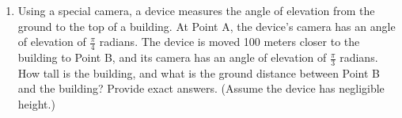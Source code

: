 \documentclass{article}
\begin{document}
\begin{enumerate}
\begin{solution}
A diagram of the situation is shown below (not to scale.)


We can first find the horizontal length in the bottom right triangle:

\begin{align*}
    \tan \ang{1.3} &= \frac{65\text{ ft}}{x} \\
    x &= \frac{65 \text{ ft}}{\tan \ang{1.3}}
\end{align*}


Then we can determine the missing vertical length:

\begin{align*}
    \tan \ang{27} &= \frac{y}{x} \\
    y &= x\tan \ang{27} \\
    &= \left(\frac{65 \text{ ft}}{\tan \ang{1.3}}\right) \tan \ang{27} \\
    & \approx 1459 \text{ ft}
\end{align*}
\end{solution}
    

\pspace{\newpage}

\item Using a special camera, a device measures the angle of elevation from the ground to the top of a building. At Point A, the device's camera has an angle of elevation of $\frac{\pi}{4}$ radians. The device is moved 100 meters closer to the building to Point B, and its camera has an angle of elevation of $\frac{\pi}{3}$ radians. How tall is the building, and what is the ground distance between Point B and the building? Provide exact answers. (Assume the device has negligible height.)


\end{enumerate}
\end{document}
